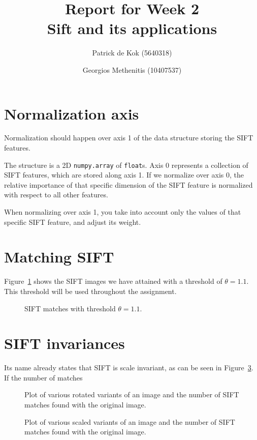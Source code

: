 \documentclass[a4paper,10pt,twoside,draft]{article}
\title{Report for Week 2\\\normalsize Sift and its applications}
\author{Patrick de Kok (5640318) \and Georgios Methenitis (10407537)}
\begin{document}
\maketitle
\thispagestyle{empty}
\newpage

\section{Normalization axis}
Normalization should happen over axis 1 of the data structure storing the SIFT features.  

The structure is a 2D \texttt{numpy.array} of \texttt{float}s.  Axis 0 represents a collection of SIFT features, which are stored along axis 1.  If we normalize over axis 0, the relative importance of that specific dimension of the SIFT feature is normalized with respect to all other features.  

When normalizing over axis 1, you take into account only the values of that specific SIFT feature, and adjust its weight.

\section{Matching SIFT}
Figure~\ref{fig:match} shows the SIFT images we have attained with a threshold of $\theta = 1.1$.  This threshold will be used throughout the assignment.
\begin{figure}
  \begin{center}
  \end{center}
  \label{fig:match}
  \caption{SIFT matches with threshold $\theta = 1.1$.}
\end{figure}

\section{SIFT invariances}
Its name already states that SIFT is scale invariant, as can be seen in Figure~\ref{fig:scale}.  If the number of matches 

\begin{figure}
  \begin{center}
  \end{center}
  \caption{Plot of various rotated variants of an image and the number of SIFT matches found with the original image.}
  \label{fig:rotation}
\end{figure}

\begin{figure}
  \begin{center}
  \end{center}
  \caption{Plot of various scaled variants of an image and the number of SIFT matches found with the original image.}
  \label{fig:scale}
\end{figure}
\end{document}
